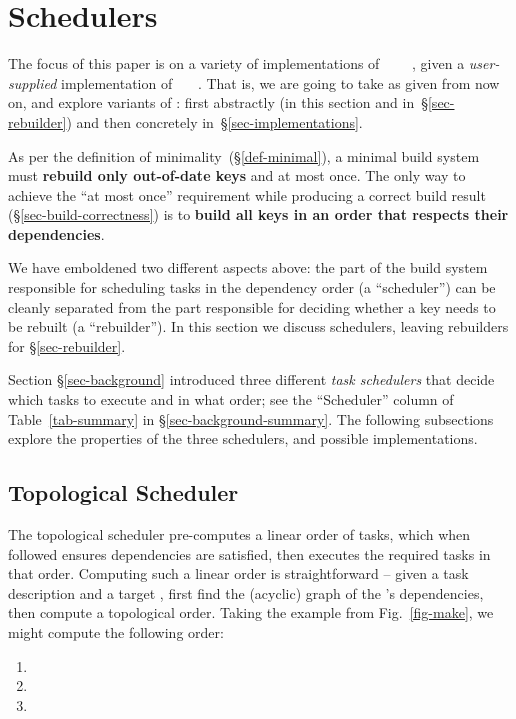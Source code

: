 \section{Schedulers}\label{sec-scheduler}

The focus of this paper is on a variety of implementations of
~~~~, given a \emph{user-supplied}
implementation of ~~~. That is, we are going to take
 as given from now on, and explore variants of : first
abstractly (in this section and in~\S\ref{sec-rebuilder}) and then concretely
in~\S\ref{sec-implementations}.

As per the definition of minimality~(\S\ref{def-minimal}), a minimal build
system must \textbf{rebuild only out-of-date keys} and at most once. The only
way to achieve the ``at most once'' requirement while producing a correct build
result (\S\ref{sec-build-correctness}) is to \textbf{build all keys in an
order that respects their dependencies}.

We have emboldened two different aspects above: the part of the build system
responsible for scheduling tasks in the dependency order (a ``scheduler'') can
be cleanly separated from the part responsible for deciding whether a key needs
to be rebuilt (a ``rebuilder''). In this section we discuss schedulers, leaving
rebuilders for \S\ref{sec-rebuilder}.

Section \S\ref{sec-background} introduced three different \emph{task schedulers}
that decide which tasks to execute and in what order; see the ``Scheduler''
column of Table~\ref{tab-summary} in \S\ref{sec-background-summary}. The
following subsections explore the properties of the three schedulers, and
possible implementations.

\subsection{Topological Scheduler}\label{sec-topological}

The topological scheduler pre-computes a linear order of tasks, which when
followed ensures dependencies are satisfied, then executes the required tasks in
that order. Computing such a linear order is straightforward -- given a task
description and a target , first find the (acyclic) graph of the
's dependencies, then compute a topological order. Taking the \Make
example from Fig.~\ref{fig-make}, we might compute the following order:

\begin{enumerate}
\item {}
\item {}
\item {}
\end{enumerate}

